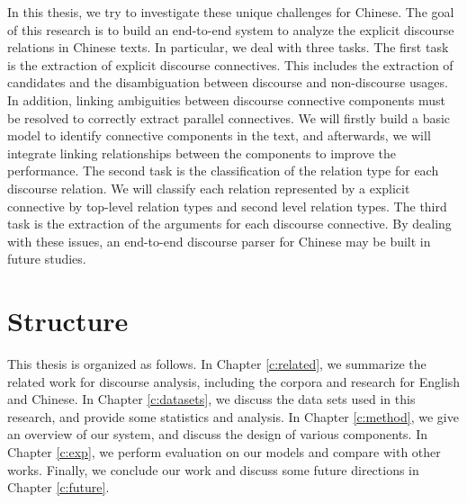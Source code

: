 In this thesis, we try to investigate these unique challenges for Chinese.
The goal of this research is to build an end-to-end system to analyze
the explicit discourse relations in Chinese texts. In particular, we
deal with three tasks. The first task is the extraction of explicit discourse
connectives. This includes the extraction of candidates and the disambiguation
between discourse and non-discourse usages. In addition, linking ambiguities
between discourse connective components must be resolved to correctly extract
parallel connectives.  We will firstly build a basic model to identify connective
components in the text, and afterwards, we will integrate linking relationships
between the components to improve the performance.
The second task is the classification of the relation type for each discourse relation.
We will classify each relation represented by a explicit connective by top-level
relation types and second level relation types.
The third task is the extraction of the arguments for each discourse connective.
By dealing with these issues, an end-to-end discourse parser for Chinese may
be built in future studies.

%
%
\section{Structure}
This thesis is organized as follows. In Chapter \ref{c:related}, we summarize
the related work for discourse analysis, including the corpora and research for
English and Chinese. In Chapter \ref{c:datasets}, we discuss the data sets used in
this research, and provide some statistics and analysis. In Chapter \ref{c:method},
we give an overview of our system, and discuss the design of various components.
In Chapter \ref{c:exp}, we perform evaluation on our models and compare with
other works. Finally, we conclude our work and discuss some future directions in
Chapter \ref{c:future}.
